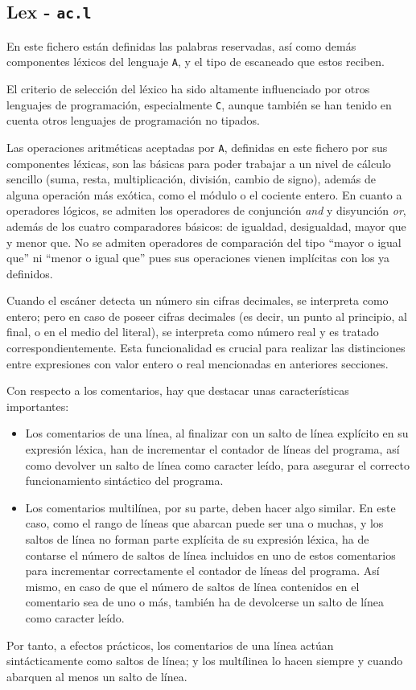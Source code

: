 \documentclass[12pt]{article}
\begin{document}
\subsection{Lex - \texttt{ac.l}} 
En este fichero están definidas las palabras reservadas, así como demás componentes léxicos del lenguaje \texttt{A}, y el tipo de escaneado que estos reciben.
\par
El criterio de selección del léxico ha sido altamente influenciado por otros lenguajes de programación, especialmente \texttt{C}, aunque también se han tenido en cuenta otros lenguajes de programación no tipados.
\par
Las operaciones aritméticas aceptadas por \texttt{A}, definidas en este fichero por sus componentes léxicas, son las básicas para poder trabajar a un nivel de cálculo sencillo (suma, resta, multiplicación, división, cambio de signo), además de alguna operación más exótica, como el módulo o el cociente entero. En cuanto a operadores lógicos, se admiten los operadores de conjunción \textit{and} y disyunción \textit{or}, además de los cuatro comparadores básicos: de igualdad, desigualdad, mayor que y menor que. No se admiten operadores de comparación del tipo ``mayor o igual que'' ni ``menor o igual que'' pues sus operaciones vienen implícitas con los ya definidos.
\par
Cuando el escáner detecta un número sin cifras decimales, se interpreta como entero; pero en caso de poseer cifras decimales (es decir, un punto al principio, al final, o en el medio del literal), se interpreta como número real y es tratado correspondientemente. Esta funcionalidad es crucial para realizar las distinciones entre expresiones con valor entero o real mencionadas en anteriores secciones.
\par
Con respecto a los comentarios, hay que destacar unas características importantes:
\begin{itemize}
    \item Los comentarios de una línea, al finalizar con un salto de línea explícito en su expresión léxica, han de incrementar el contador de líneas del programa, así como devolver un salto de línea como caracter leído, para asegurar el correcto funcionamiento sintáctico del programa.
    \item Los comentarios multilínea, por su parte, deben hacer algo similar. En este caso, como el rango de líneas que abarcan puede ser una o muchas, y los saltos de línea no forman parte explícita de su expresión léxica, ha de contarse el número de saltos de línea incluidos en uno de estos comentarios para incrementar correctamente el contador de líneas del programa. Así mismo, en caso de que el número de saltos de línea contenidos en el comentario sea de uno o más, también ha de devolcerse un salto de línea como caracter leído.
\end{itemize}
Por tanto, a efectos prácticos, los comentarios de una línea actúan sintácticamente como saltos de línea; y los multílinea lo hacen siempre y cuando abarquen al menos un salto de línea.
\end{document}
